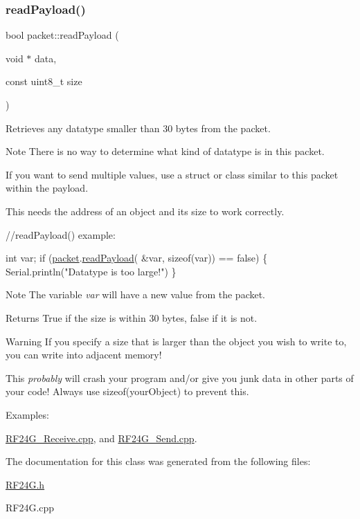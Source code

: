 \subsubsection{\texorpdfstring{read\+Payload()}{readPayload()}}
{\footnotesize\ttfamily bool packet\+::read\+Payload (\begin{DoxyParamCaption}\item[{void $\ast$}]{data,  }\item[{const uint8\+\_\+t}]{size }\end{DoxyParamCaption})}

Retrieves any datatype smaller than 30 bytes from the packet. \begin{DoxyNote}{Note}
There is no way to determine what kind of datatype is in this packet. 

If you want to send multiple values, use a struct or class similar to this packet within the payload.
\end{DoxyNote}
This needs the address of an object and it\textquotesingle{}s size to work correctly.


\begin{DoxyCode}
\textcolor{comment}{//readPayload() example:}

     \textcolor{keywordtype}{int} var;
     \textcolor{keywordflow}{if} (\hyperlink{classpacket}{packet}.\hyperlink{classpacket_a6d50c91a97477e0de8ff0d3a23341f73}{readPayload}( &var, \textcolor{keyword}{sizeof}(var)) == \textcolor{keyword}{false}) \{
         Serial.println(\textcolor{stringliteral}{"Datatype is too large!"})
     \}
\end{DoxyCode}


\begin{DoxyNote}{Note}
The variable {\itshape var} will have a new value from the packet.
\end{DoxyNote}
\begin{DoxyReturn}{Returns}
True if the size is within 30 bytes, false if it is not.
\end{DoxyReturn}
\begin{DoxyWarning}{Warning}
If you specify a size that is larger than the object you wish to write to, you can write into adjacent memory! 

This {\itshape probably} will crash your program and/or give you junk data in other parts of your code! Always use sizeof(your\+Object) to prevent this. 
\end{DoxyWarning}
\begin{Desc}
\item[Examples\+: ]\par
\hyperlink{_r_f24_g__receive_8cpp-example}{R\+F24\+G\+\_\+\+Receive.\+cpp}, and \hyperlink{_r_f24_g__send_8cpp-example}{R\+F24\+G\+\_\+\+Send.\+cpp}.\end{Desc}


The documentation for this class was generated from the following files\+:\begin{DoxyCompactItemize}
\item 
\hyperlink{_r_f24_g_8h}{R\+F24\+G.\+h}\item 
R\+F24\+G.\+cpp\end{DoxyCompactItemize}
